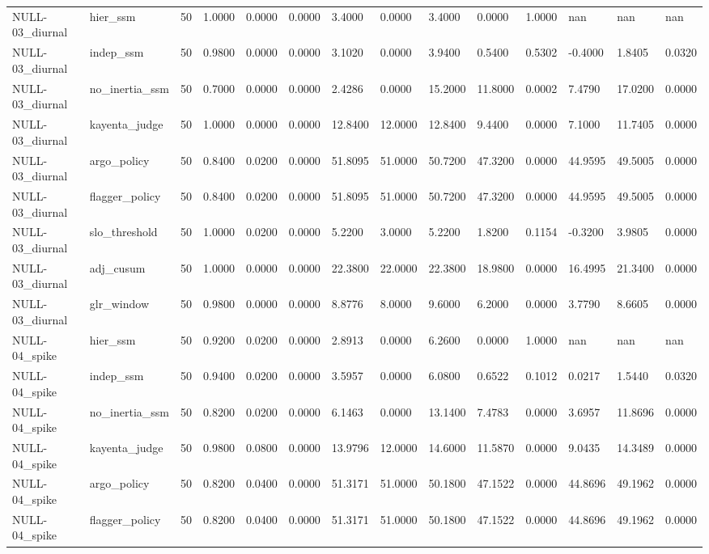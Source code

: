 \begin{table}[htbp]
\begin{tabular}{llllllllllllll}
NULL-03\_diurnal & hier\_ssm & 50 & 1.0000 & 0.0000 & 0.0000 & 3.4000 & 0.0000 & 3.4000 & 0.0000 & 1.0000 & nan & nan & nan \\
NULL-03\_diurnal & indep\_ssm & 50 & 0.9800 & 0.0000 & 0.0000 & 3.1020 & 0.0000 & 3.9400 & 0.5400 & 0.5302 & -0.4000 & 1.8405 & 0.0320 \\
NULL-03\_diurnal & no\_inertia\_ssm & 50 & 0.7000 & 0.0000 & 0.0000 & 2.4286 & 0.0000 & 15.2000 & 11.8000 & 0.0002 & 7.4790 & 17.0200 & 0.0000 \\
NULL-03\_diurnal & kayenta\_judge & 50 & 1.0000 & 0.0000 & 0.0000 & 12.8400 & 12.0000 & 12.8400 & 9.4400 & 0.0000 & 7.1000 & 11.7405 & 0.0000 \\
NULL-03\_diurnal & argo\_policy & 50 & 0.8400 & 0.0200 & 0.0000 & 51.8095 & 51.0000 & 50.7200 & 47.3200 & 0.0000 & 44.9595 & 49.5005 & 0.0000 \\
NULL-03\_diurnal & flagger\_policy & 50 & 0.8400 & 0.0200 & 0.0000 & 51.8095 & 51.0000 & 50.7200 & 47.3200 & 0.0000 & 44.9595 & 49.5005 & 0.0000 \\
NULL-03\_diurnal & slo\_threshold & 50 & 1.0000 & 0.0200 & 0.0000 & 5.2200 & 3.0000 & 5.2200 & 1.8200 & 0.1154 & -0.3200 & 3.9805 & 0.0000 \\
NULL-03\_diurnal & adj\_cusum & 50 & 1.0000 & 0.0000 & 0.0000 & 22.3800 & 22.0000 & 22.3800 & 18.9800 & 0.0000 & 16.4995 & 21.3400 & 0.0000 \\
NULL-03\_diurnal & glr\_window & 50 & 0.9800 & 0.0000 & 0.0000 & 8.8776 & 8.0000 & 9.6000 & 6.2000 & 0.0000 & 3.7790 & 8.6605 & 0.0000 \\
NULL-04\_spike & hier\_ssm & 50 & 0.9200 & 0.0200 & 0.0000 & 2.8913 & 0.0000 & 6.2600 & 0.0000 & 1.0000 & nan & nan & nan \\
NULL-04\_spike & indep\_ssm & 50 & 0.9400 & 0.0200 & 0.0000 & 3.5957 & 0.0000 & 6.0800 & 0.6522 & 0.1012 & 0.0217 & 1.5440 & 0.0320 \\
NULL-04\_spike & no\_inertia\_ssm & 50 & 0.8200 & 0.0200 & 0.0000 & 6.1463 & 0.0000 & 13.1400 & 7.4783 & 0.0000 & 3.6957 & 11.8696 & 0.0000 \\
NULL-04\_spike & kayenta\_judge & 50 & 0.9800 & 0.0800 & 0.0000 & 13.9796 & 12.0000 & 14.6000 & 11.5870 & 0.0000 & 9.0435 & 14.3489 & 0.0000 \\
NULL-04\_spike & argo\_policy & 50 & 0.8200 & 0.0400 & 0.0000 & 51.3171 & 51.0000 & 50.1800 & 47.1522 & 0.0000 & 44.8696 & 49.1962 & 0.0000 \\
NULL-04\_spike & flagger\_policy & 50 & 0.8200 & 0.0400 & 0.0000 & 51.3171 & 51.0000 & 50.1800 & 47.1522 & 0.0000 & 44.8696 & 49.1962 & 0.0000 \\

\end{tabular}
\end{table}

